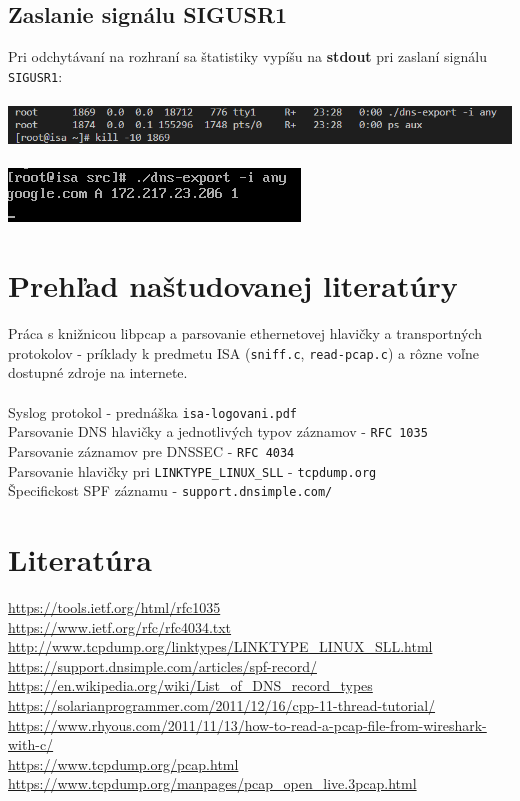 \documentclass{article}
\begin{document}
        \subsection{Zaslanie signálu SIGUSR1}
        \noindent
        Pri odchytávaní na rozhraní sa štatistiky vypíšu na \textbf{stdout} pri zaslaní signálu \texttt{SIGUSR1}:\\\\
        \includegraphics[scale=0.6]{i2.png}\\\\
        \includegraphics[scale=0.6]{i3.png}
    
    \newpage
    \section{Prehľad naštudovanej literatúry}
        \noindent
        Práca s knižnicou libpcap a parsovanie ethernetovej hlavičky a transportných protokolov - príklady
        k predmetu ISA (\texttt{sniff.c}, \texttt{read-pcap.c}) a rôzne voľne dostupné zdroje na internete.\\\\
        Syslog protokol - prednáška \texttt{isa-logovani.pdf}\\ 
        Parsovanie DNS hlavičky a jednotlivých typov záznamov - \texttt{RFC 1035}\\
        Parsovanie záznamov pre DNSSEC - \texttt{RFC 4034}\\
        Parsovanie hlavičky pri \texttt{LINKTYPE\_LINUX\_SLL} - \texttt{tcpdump.org}\\
        Špecifickost SPF záznamu - \texttt{support.dnsimple.com/}
    
    \section{Literatúra}
    \noindent
    \url{https://tools.ietf.org/html/rfc1035}\\
    \url{https://www.ietf.org/rfc/rfc4034.txt}\\
    \url{http://www.tcpdump.org/linktypes/LINKTYPE_LINUX_SLL.html}\\
    \url{https://support.dnsimple.com/articles/spf-record/}\\
    \url{https://en.wikipedia.org/wiki/List_of_DNS_record_types}\\
    \url{https://solarianprogrammer.com/2011/12/16/cpp-11-thread-tutorial/}\\
    \url{https://www.rhyous.com/2011/11/13/how-to-read-a-pcap-file-from-wireshark-with-c/}\\
    \url{https://www.tcpdump.org/pcap.html}\\
    \url{https://www.tcpdump.org/manpages/pcap_open_live.3pcap.html}\\
\end{document}
